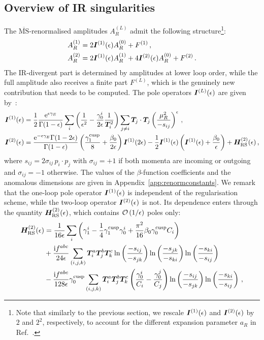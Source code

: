 \documentclass[main.tex]{subfiles}
\begin{document}
\subsection{Overview of IR singularities}
The $\overline{\text{MS}}$-renormalised amplitudes $A_R^{(L)}$ admit the following structure\footnote{Note that similarly to the previous section, we rescale $\bm{I}^{(1)}(\epsilon)$ and $\bm{I}^{(2)}(\epsilon)$ by $2$ and $2^2$, respectively, to account for the different expansion parameter $a_R$ in Ref.~\cite{Catani:1998bh}.}:
\begin{align}
    A_R^{(1)} &= 2\bm{I}^{(1)}(\epsilon) A_R^{(0)} + F^{(1)}\,, \label{eq:A1IRstructure} \\
    A_R^{(2)} &= 2\bm{I}^{(1)}(\epsilon) A_R^{(1)} + 4\bm{I}^{(2)}(\epsilon) A_R^{(0)} + F^{(2)} \,. \label{eq:A2IRstructure}
\end{align}
The IR-divergent part is determined by amplitudes at lower loop order, while the full amplitude also receives a finite part $F^{(L)}$, which is the genuinely new contribution that needs to be computed. The pole operators $\bm{I}^{(L)}(\epsilon)$ are given by~\cite{Catani:1998bh}:
\begin{align}
    \bm{I}^{(1)}(\epsilon) &= \frac{1}{2} \frac{\mathrm{e}^{\epsilon \gamma_E}}{\Gamma(1-\epsilon)} \sum_i \left(\frac{1}{\epsilon^2} - \frac{\gamma_0^i}{2\epsilon} \frac{1}{\bm{T}_i^2}\right) \sum_{j\neq i} \bm{T}_j \cdot \bm{T}_j \left(\frac{\mu_R^2}{-s_{ij}} \right)^\epsilon\,, \\
    \bm{I}^{(2)}(\epsilon) &= \frac{\mathrm{e}^{-\epsilon \gamma_E} \Gamma(1-2\epsilon)}{\Gamma(1-\epsilon)} \left( \frac{\gamma_1^\text{cusp}}{8} + \frac{\beta_0}{2\epsilon} \right) \bm{I}^{(1)}(2\epsilon) - \frac{1}{2}\bm{I}^{(1)}(\epsilon) \left(\bm{I}^{(1)}(\epsilon) + \frac{\beta_0}{\epsilon} \right) + \bm{H}_{\text{RS}}^{(2)}(\epsilon)\,,
\end{align}
where $s_{ij} = 2 \sigma_{ij} \, p_i \cdot p_j$ with $\sigma_{ij}=+1$ if both momenta are incoming or outgoing and $\sigma_{ij}=-1$ otherwise. The values of the $\beta$-function coefficients and the anomalous dimensions are given in Appendix~\ref{app:renormconstants}. We remark that the one-loop pole operator $\bm{I}^{(1)}(\epsilon)$ is independent of the regularisation scheme, while the two-loop operator $\bm{I}^{(2)}(\epsilon)$ is not. Its dependence enters through the quantity $\bm{H}_{\text{RS}}^{(2)}(\epsilon)$, which contains $\mathcal{O}\left(1/\epsilon\right)$ poles only:
\begin{align} \label{eq:IR_H_function}
    \bm{H}_{\text{RS}}^{(2)}(\epsilon) &= \frac{1}{16\epsilon} \sum_i \left(\gamma_1^i - \frac{1}{4} \gamma_1^{\text{cusp}}\gamma_0^i + \frac{\pi^2}{16} \beta_0 \gamma_0^{\text{cusp}} C_i \right) \nonumber \\
    &+ \frac{\mathrm{i} f^{abc}}{24\epsilon} \sum_{(i,j,k)} \bm{T}_i^a \bm{T}_j^b \bm{T}_k^c \ln\left(\frac{-s_{ij}}{-s_{jk}} \right) \ln\left(\frac{-s_{jk}}{-s_{ki}} \right) \ln\left(\frac{-s_{ki}}{-s_{ij}} \right) \\ 
    &-\frac{\mathrm{i} f^{abc}}{128\epsilon} \gamma_0^{\text{cusp}} \sum_{(i,j,k)} \bm{T}_i^a \bm{T}_j^b \bm{T}_k^c \left( \frac{\gamma_0^i}{C_i} - \frac{\gamma_0^j}{C_j} \right)\ln\left(\frac{-s_{ij}}{-s_{jk}} \right) \ln\left(\frac{-s_{ki}}{-s_{ij}} \right)\,, \nonumber
\end{align}
\end{document}
